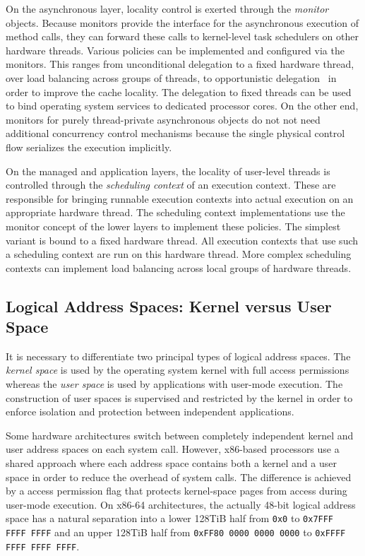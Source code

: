 On the asynchronous layer, locality control is exerted through the \emph{monitor} objects. Because monitors provide the interface for the asynchronous execution of method calls, they can forward these calls to kernel-level task schedulers on other hardware threads. Various policies can be implemented and configured via the monitors. This ranges from unconditional delegation to a fixed hardware thread, over load balancing across groups of threads, to opportunistic delegation~\cite{FatourouKallimanis2012} in order to improve the cache locality. The delegation to fixed threads can be used to bind operating system services to dedicated processor cores.
On the other end, monitors for purely thread-private asynchronous objects do not not need additional concurrency control mechanisms because the single physical control flow serializes the execution implicitly.

On the managed and application layers, the locality of user-level threads is controlled through the \emph{scheduling context} of an execution context. These are responsible for bringing runnable execution contexts into actual execution on an appropriate hardware thread. The scheduling context implementations use the monitor concept of the lower layers to implement these policies. The simplest variant is bound to a fixed hardware thread. All execution contexts that use such a scheduling context are run on this hardware thread. More complex scheduling contexts can implement load balancing across local groups of hardware threads. 

\subsection{Logical Address Spaces: Kernel versus User Space}
\label{sec:address-space-phys}

It is necessary to differentiate two principal types of logical address spaces. The \emph{kernel space} is used by the operating system kernel with full access permissions whereas the \emph{user space} is used by applications with user-mode execution. The construction of user spaces is supervised and restricted by the kernel in order to enforce isolation and protection between independent applications. 

Some hardware architectures switch between completely independent kernel and user address spaces on each system call. However, x86-based processors use a shared approach where each address space contains both a kernel and a user space in order to reduce the overhead of system calls. The difference is achieved by a access permission flag that protects kernel-space pages from access during user-mode execution. On x86-64 architectures, the actually 48-bit logical address space has a natural separation into a lower 128TiB half from \texttt{0x0} to \texttt{0x7FFF\,FFFF\,FFFF} and an upper 128TiB half from \texttt{0xFF80\,0000\,0000\,0000} to \texttt{0xFFFF\,FFFF\,FFFF\,FFFF}. 

